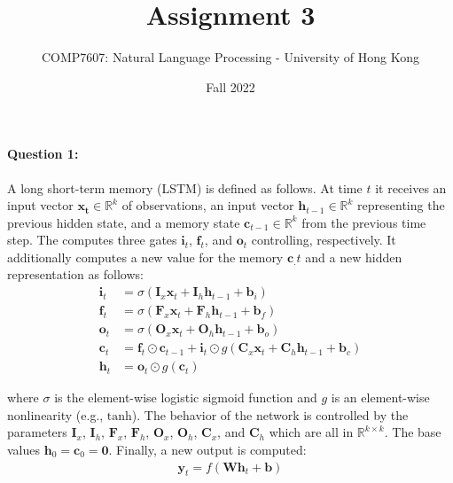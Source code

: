 \documentclass[10pt]{article}
\begin{document}

\title{Assignment 3}
\author{COMP7607: Natural Language Processing - University of Hong Kong}
\date{Fall 2022}
\maketitle

\paragraph{Question 1:} A long short-term memory (LSTM) is defined as follows. At time $t$ it receives an input vector $\boldsymbol{x_t} \in \mathbb{R}^k$ of observations, an input vector $\mathbf{h}_{t-1} \in \mathbb{R}^k$ representing the previous hidden state, and a memory state $\mathbf{c}_{t-1} \in \mathbb{R}^k$ from the previous time step. The computes three gates $\mathbf{i}_t$, $\mathbf{f}_t$, and $\mathbf{o}_t$ controlling, respectively. It additionally computes a new value for the memory $\mathbf{c}_.t$ and a new hidden representation as follows:
\begin{align*}
  \mathbf{i}_t & = \sigma(\mathbf{I}_{x}\mathbf{x}_t + \mathbf{I}_h\mathbf{h}_{t-1} + \mathbf{b}_i)                                                     \\
  \mathbf{f}_t & = \sigma(\mathbf{F}_{x}\mathbf{x}_t + \mathbf{F}_h\mathbf{h}_{t-1} + \mathbf{b}_f )                                                    \\
  \mathbf{o}_t & = \sigma(\mathbf{O}_x\mathbf{x}_t + \mathbf{O}_h\mathbf{h}_{t-1} + \mathbf{b}_o)                                                       \\
  \mathbf{c}_t & = \mathbf{f}_t \odot \mathbf{c}_{t-1} + \mathbf{i}_{t} \odot g(\mathbf{C}_x\mathbf{x}_t + \mathbf{C}_h\mathbf{h}_{t-1} + \mathbf{b}_c) \\
  \mathbf{h}_t & = \mathbf{o}_{t} \odot g(\mathbf{c}_t)
\end{align*}

where $\sigma$ is the element-wise logistic sigmoid function and $g$ is an element-wise nonlinearity (e.g., $\text{tanh}$). The behavior of the network is controlled by the parameters $\mathbf{I}_x$, $\mathbf{I}_h$, $\mathbf{F}_x$, $\mathbf{F}_h$, $\mathbf{O}_x$, $\mathbf{O}_h$, $\mathbf{C}_x$, and $\mathbf{C}_h$ which are all in $\mathbb{R}^{k\times k}$. The base values $\mathbf{h}_0 = \mathbf{c}_0 = \mathbf{0}$. Finally, a new output is computed:
\begin{align*}
  \mathbf{y}_t = f(\mathbf{W}\mathbf{h}_t + \mathbf{b})
\end{align*}
\end{document}
